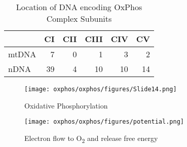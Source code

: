 \documentclass{scrartcl}
\begin{document}
\begin{table}[htbp]
\caption{\label{tab:orga3dee50}Location of DNA encoding OxPhos Complex Subunits}
\centering
\begin{tabular}{lrrrrr}
 & CI & CII & CIII & CIV & CV\\
\hline
mtDNA & 7 & 0 & 1 & 3 & 2\\
nDNA & 39 & 4 & 10 & 10 & 14\\
\end{tabular}
\end{table}

\begin{figure}[htbp]
\centering
\texttt{[image: oxphos/oxphos/figures/Slide14.png]}
\caption[ETC]{\label{fig:orgec200f7}Oxidative Phosphorylation}
\end{figure}

\begin{figure}[htbp]
\centering
\texttt{[image: oxphos/oxphos/figures/potential.png]}
\caption[redox]{\label{fig:org0f906e0}Electron flow to O\textsubscript{2} and release free energy}
\end{figure}
\end{document}
